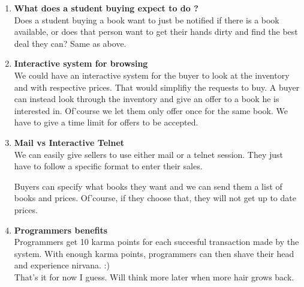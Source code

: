 \begin{enumerate}
\item  {\bf What does a student buying expect to do ?}\\

Does a student buying a book want to just be notified if there is a
book available, or does that person want to get their hands dirty and
find the best deal they can?  Same as above.


\item  {\bf Interactive system for browsing}\\

We could have an interactive system for the buyer to look at the
inventory and with respective prices.  That would simplifiy the
requests to buy.  A buyer can instead look through the inventory and
give an offer to a book he is interested in.  Of'course we let them
only offer once for the same book.  We have to give a time limit for
offers to be accepted.


\item  {\bf Mail vs Interactive Telnet}\\

We can easily give sellers to use either mail or a telnet session.
They just have to follow a specific format to enter their sales.

Buyers can specify what books they want and we can send them a list of
books and prices.  Of'course, if they choose that, they will not get
up to date prices.


\item {\bf Programmers benefits}\\

Programmers get 10 karma points for each succesful transaction made by
the system.  With enough karma points, programmers can then shave
their head and experience nirvana.  :)\\
That's it for now I guess.  Will think more later when more hair grows
back.
\end{enumerate}



